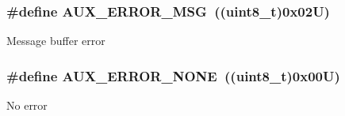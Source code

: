 \subsubsection[{\texorpdfstring{A\+U\+X\+\_\+\+E\+R\+R\+O\+R\+\_\+\+M\+SG}{AUX_ERROR_MSG}}]{\setlength{\rightskip}{0pt plus 5cm}\#define A\+U\+X\+\_\+\+E\+R\+R\+O\+R\+\_\+\+M\+SG~((uint8\+\_\+t)0x02\+U)}\hypertarget{group___k_n_x___aux___error___code_ga8e01b81bddb576a48d989c7ba75b7cc7}{}\label{group___k_n_x___aux___error___code_ga8e01b81bddb576a48d989c7ba75b7cc7}
Message buffer error 
\subsubsection[{\texorpdfstring{A\+U\+X\+\_\+\+E\+R\+R\+O\+R\+\_\+\+N\+O\+NE}{AUX_ERROR_NONE}}]{\setlength{\rightskip}{0pt plus 5cm}\#define A\+U\+X\+\_\+\+E\+R\+R\+O\+R\+\_\+\+N\+O\+NE~((uint8\+\_\+t)0x00\+U)}\hypertarget{group___k_n_x___aux___error___code_ga1e08e2873ccb2fb0f45f8e02c05c5733}{}\label{group___k_n_x___aux___error___code_ga1e08e2873ccb2fb0f45f8e02c05c5733}
No error 